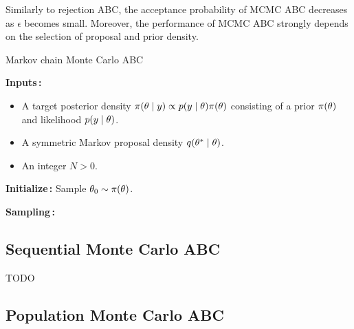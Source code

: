 Similarly to rejection ABC, the acceptance probability of MCMC ABC decreases as $\epsilon$ becomes small. Moreover, the performance of MCMC ABC strongly depends on the selection of proposal and prior density.

\begin{algorithm}[H]
\caption{Markov chain Monte Carlo ABC}
\label{alg:mcmcabc}
\SetAlgoLined
\DontPrintSemicolon
 \textbf{Inputs\,:}\;
 \vspace{-5mm}
 \begin{itemize}
     \item A target posterior density $\pi \qty(\theta \mid y) \propto p \qty(y \mid \theta) \pi \qty(\theta)$ consisting of a prior $\pi \qty(\theta)$ and likelihood $p \qty(y \mid \theta)$. 
     \item A symmetric Markov proposal density $q \qty(\theta^* \mid \theta)$.
     \item An integer $N>0$.
 \end{itemize}
 
 \vspace{5mm}
 \textbf{Initialize\,:}\;
 Sample $\theta_0 \sim \pi \qty(\theta)$.\;

 \vspace{5mm}
 \textbf{Sampling\,:}\;
\end{algorithm}

\subsection{Sequential Monte Carlo ABC}\label{sec:smc_abc}

TODO

\subsection{Population Monte Carlo ABC}\label{sec:pmc_abc}

